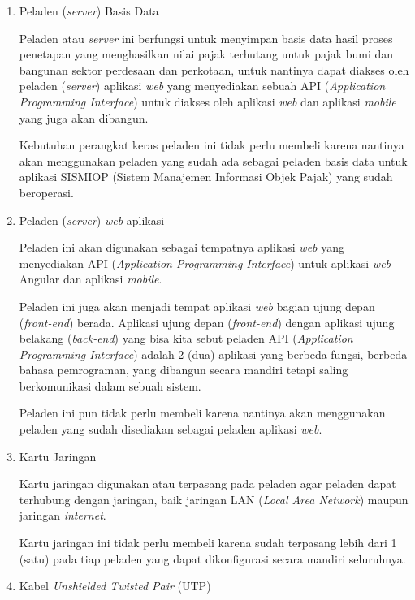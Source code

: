 \documentclass[pdftex,12pt, oneside]{article}
\begin{document}
\begin{enumerate}
	\item Peladen (\textit{server}) Basis Data
	
Peladen atau \textit{server} ini berfungsi untuk menyimpan basis data hasil proses penetapan yang menghasilkan nilai pajak terhutang untuk pajak bumi dan bangunan sektor perdesaan dan perkotaan, untuk nantinya dapat diakses oleh peladen (\textit{server}) aplikasi \textit{web} yang menyediakan sebuah API (\textit{Application Programming Interface}) untuk diakses oleh aplikasi \textit{web} dan aplikasi \textit{mobile} yang juga akan dibangun.

Kebutuhan perangkat keras peladen ini tidak perlu membeli karena nantinya akan menggunakan peladen yang sudah ada sebagai peladen basis data untuk aplikasi SISMIOP (Sistem Manajemen Informasi Objek Pajak) yang sudah beroperasi.
	
	\item Peladen (\textit{server}) \textit{web} aplikasi
	
Peladen ini akan digunakan sebagai tempatnya aplikasi \textit{web} yang menyediakan API (\textit{Application Programming Interface})	untuk aplikasi \textit{web} Angular dan aplikasi \textit{mobile}.

Peladen ini juga akan menjadi tempat aplikasi \textit{web} bagian ujung depan (\textit{front-end}) berada. Aplikasi ujung depan (\textit{front-end}) dengan aplikasi ujung belakang (\textit{back-end}) yang bisa kita sebut peladen API (\textit{Application Programming Interface}) adalah 2 (dua) aplikasi yang berbeda fungsi, berbeda bahasa pemrograman, yang dibangun secara mandiri tetapi saling berkomunikasi dalam sebuah sistem.

Peladen ini pun tidak perlu membeli karena nantinya akan menggunakan peladen yang sudah disediakan sebagai peladen aplikasi \textit{web}.
	
	\item Kartu Jaringan
	
Kartu jaringan digunakan atau terpasang pada peladen agar peladen dapat terhubung dengan jaringan, baik jaringan LAN (\textit{Local Area Network}) maupun jaringan \textit{internet}. 

Kartu jaringan ini tidak perlu membeli karena sudah terpasang lebih dari 1 (satu) pada tiap peladen yang dapat dikonfigurasi secara mandiri seluruhnya.
	
	\item Kabel \textit{Unshielded Twisted Pair} (UTP)
	

\end{enumerate}
\end{document}
